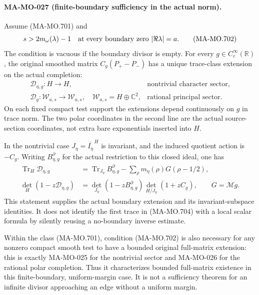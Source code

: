 \paragraph{MA-MO-027 (finite-boundary sufficiency in the actual norm).}
Assume (MA-MO.701) and
\[
        s>2m_\omega(\lambda)-1
               \quad\hbox{at every boundary zero }|\Re\lambda|=a .
 \tag{MA-MO.702}
\]
The condition is vacuous if the boundary divisor is empty.
For every \(g\in C_c^\infty(\mathbb R)\), the original
smoothed matrix \(C_g(P_+-P_-)\) has a unique trace-class
extension on the actual completion:
\[
 \begin{array}{ll}
 \mathscr D_{\eta,g}:H\longrightarrow H,
       &\text{nontrivial character sector},\\[2pt]
 \mathscr D_g:\mathcal W_{a,s}\longrightarrow\mathcal W_{a,s},
       \quad\mathcal W_{a,s}=H\oplus\mathbb C^2,
       &\text{rational principal sector}.
 \end{array}
 \tag{MA-MO.703}
\]
On each fixed compact test support the extensions depend
continuously on \(g\) in trace norm. The two polar coordinates
in the second line are the actual source-section coordinates,
not extra bare exponentials inserted into \(H\).

In the nontrivial case \(J_\eta=\overline{I_\eta}^{\,H}\)
is invariant, and the induced quotient action is \(-C_g\).
Writing \(B_{\eta,g}^{\partial}\) for the actual restriction
to this closed ideal, one has
\[
 \begin{aligned}
 \operatorname{Tr}_H\mathscr D_{\eta,g}
   &=\operatorname{Tr}_{J_\eta}B_{\eta,g}^{\partial}
                  -\sum_\rho m_\eta(\rho)G(\rho-1/2),\\
 \det_H(1-z\mathscr D_{\eta,g})
   &=\det_{J_\eta}(1-zB_{\eta,g}^{\partial})
                         \det_{H/J_\eta}(1+zC_g),
               \qquad G=\mathcal Mg .
 \end{aligned}
 \tag{MA-MO.704}
\]
This statement supplies the actual boundary extension and
its invariant-subspace identities. It does not identify
the first trace in (MA-MO.704) with a local scalar formula
by silently reusing a no-boundary inverse estimate.

Within the class (MA-MO.701), condition (MA-MO.702) is
also necessary for any nonzero compact smooth test to have
a bounded original full-matrix extension: this is exactly
MA-MO-025 for the nontrivial sector and MA-MO-026 for the
rational polar completion. Thus it characterizes bounded
full-matrix existence in this finite-boundary, uniform-margin
case. It is not a sufficiency theorem for an infinite divisor
approaching an edge without a uniform margin.

